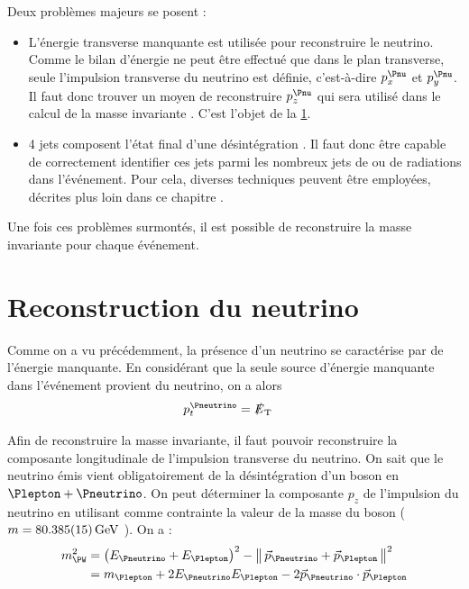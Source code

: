 Deux problèmes majeurs se posent :
\begin{itemize}
    \item L'énergie transverse manquante est utilisée pour reconstruire le neutrino. Comme le bilan d'énergie ne peut être effectué que dans le plan transverse, seule l'impulsion transverse du neutrino est définie, c'est-à-dire $p_x^{\Pnu}$ et $p_y^{\Pnu}$. Il faut donc trouver un moyen de reconstruire $p_z^{\Pnu}$ qui sera utilisé dans le calcul de la masse invariante \ttbar. C'est l'objet de la \cref{sec:neutrino}.
    \item 4 jets composent l'état final d'une désintégration \ttbar. Il faut donc être capable de correctement identifier ces jets parmi les nombreux jets de \pu ou de radiations dans l'événement. Pour cela, diverses techniques peuvent être employées, décrites plus loin dans ce chapitre .
\end{itemize}

Une fois ces problèmes surmontés, il est possible de reconstruire la masse invariante pour chaque événement.

\section{Reconstruction du neutrino} \label{sec:neutrino}

Comme on a vu précédemment, la présence d'un neutrino se caractérise par de l'énergie manquante. En considérant que la seule source d'énergie manquante dans l'événement provient du neutrino, on a alors
\begin{align*}
  p_t^{\Pneutrino} &= \met
\end{align*}

Afin de reconstruire la masse invariante, il faut pouvoir reconstruire la composante longitudinale de l'impulsion transverse du neutrino. On sait que le neutrino émis vient obligatoirement de la désintégration d'un boson \PW en $\Plepton + \Pneutrino$. On peut déterminer la composante $p_z$ de l'impulsion du neutrino en utilisant comme contrainte la valeur de la masse du boson \PW ($m = \SI{80.385 \pm 0.015}{\GeV}$ \citep{pdg}). On a :
\begin{align*}
  m_{\PW}^2 &= \left( E_{\Pneutrino} + E_{\Plepton} \right)^2 - \norm{ \vec{p}_{\Pneutrino} + \vec{p}_{\Plepton} }^2 \\
  &= m_{\Plepton} + 2E_{\Pneutrino}E_{\Plepton} - 2 \vec{p}_{\Pneutrino} \cdot \vec{p}_{\Plepton}
\end{align*}

